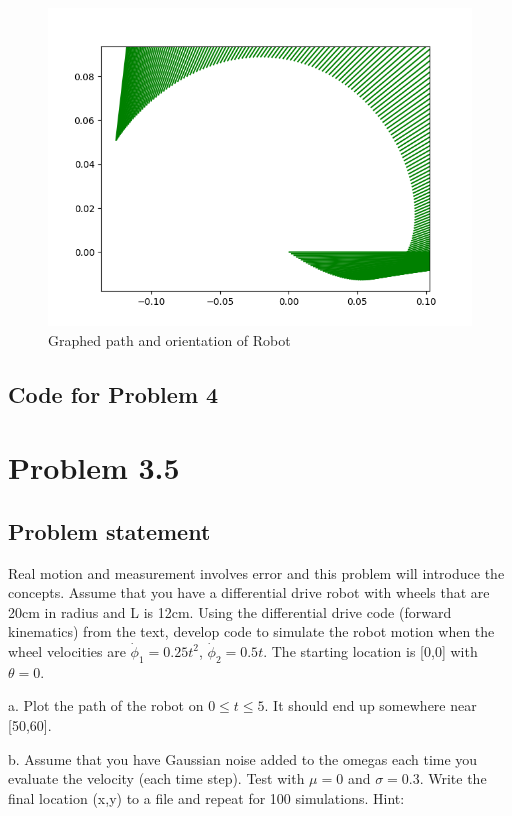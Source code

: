 \documentclass[letterpaper,11pt]{texMemo} %
\begin{document}
\begin{figure}[ht]
\caption{Graphed path and orientation of Robot}
\centering
\includegraphics[scale=0.45]{img/P4b.png}
\end{figure}

\newpage
\subsection*{Code for Problem 4}
\begin{tiny}

\end{tiny}

\newpage
\section*{Problem 3.5}
\subsection*{Problem statement}
Real motion and measurement involves error and this problem will introduce the concepts.
Assume that you have a differential drive robot with wheels that are 20cm in radius and 
L is 12cm. Using the differential drive code (forward kinematics) from the text, develop 
code to simulate the robot motion when the wheel velocities are $\dot{\phi}_1 = 0.25t^2$,
$\dot{\phi}_2 = 0.5t$. The starting location is [0,0] with $\theta = 0$.

a. Plot the path of the robot on $0 \leq t \leq 5$. It should end up somewhere near [50,60].

b. Assume that you have Gaussian noise added to the omegas each time you evaluate the velocity
(each time step). Test with $\mu = 0$ and $\sigma = 0.3$. Write the final location (x,y) to a 
file and repeat for 100 simulations. Hint:
\end{document}
